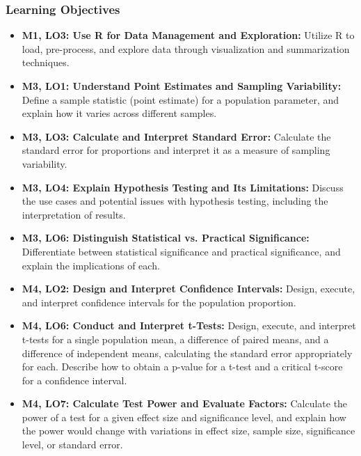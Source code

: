 \begin{frame}
    \frametitle{Learning Objectives}
    \begin{itemize}
        \item \textbf{M1, LO3: Use R for Data Management and Exploration:} Utilize R to load, pre-process, and explore data through visualization and summarization techniques.
        \item \textbf{M3, LO1: Understand Point Estimates and Sampling Variability:} Define a sample statistic (point estimate) for a population parameter, and explain how it varies across different samples.
        \item \textbf{M3, LO3: Calculate and Interpret Standard Error:} Calculate the standard error for proportions and interpret it as a measure of sampling variability.
        \item \textbf{M3, LO4: Explain Hypothesis Testing and Its Limitations:} Discuss the use cases and potential issues with hypothesis testing, including the interpretation of results.
        \item \textbf{M3, LO6: Distinguish Statistical vs. Practical Significance:} Differentiate between statistical significance and practical significance, and explain the implications of each.
        \item \textbf{M4, LO2: Design and Interpret Confidence Intervals:} Design, execute, and interpret confidence intervals for the population proportion.
        \item \textbf{M4, LO6: Conduct and Interpret t-Tests:} Design, execute, and interpret t-tests for a single population mean, a difference of paired means, and a difference of independent means, calculating the standard error appropriately for each. Describe how to obtain a p-value for a t-test and a critical t-score for a confidence interval.    
        \item \textbf{M4, LO7: Calculate Test Power and Evaluate Factors:} Calculate the power of a test for a given effect size and significance level, and explain how the power would change with variations in effect size, sample size, significance level, or standard error.
    \end{itemize}
\end{frame}
    
